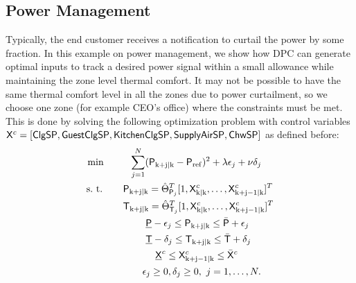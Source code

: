 \subsection{Power Management}
\label{SS:powermanagement}
Typically, the end customer receives a notification to curtail the power by some fraction. 
In this example on power management, we show how DPC can generate optimal inputs to track a desired power signal within a small allowance while maintaining the zone level thermal comfort. It may not be possible to have the same thermal comfort level in all the zones due to power curtailment, so we choose one zone (for example CEO's office) where the constraints must be met.
This is done by solving the following optimization problem with control variables $\mathsf{X}^c = [\mathsf{ClgSP},\mathsf{GuestClgSP},\mathsf{KitchenClgSP},\mathsf{SupplyAirSP}, \mathsf{ChwSP}]$ as defined before:
\begin{align}
\begin{aligned}
\text{min } & \ \ \ \ \ \ \ \sum_{j=1}^{N} ({\mathsf{P}}_{\mathrm{k+j|k}} - \mathsf{P}_{\mathrm{ref}})^2 +  \lambda\epsilon_j + \nu \delta_j \\
\text{s.~t. } & \ \ \ \ \ \mathsf{P}_{\mathrm{k+j|k}} =  \hat{\Theta}^T_{\mathsf{P}_j} [ 1,\mathsf{X}^c_{\mathrm{k|k}},\dots,\mathsf{X}^c_{\mathrm{k+j-1|k}} ]^T \\
& \ \ \ \ \ \mathsf{T}_{\mathrm{k+j|k}} =  \hat{\Theta}^T_{\mathsf{T}_j} [ 1,\mathsf{X}^c_{\mathrm{k|k}},\dots,\mathsf{X}^c_{\mathrm{k+j-1|k}} ]^T \\
& \ \ \ \ \ \ \ \ \ \ \ \ \underline{\mathsf{P}}-\epsilon_j \leq \mathsf{P}_{\mathrm{k+j|k}} \leq \bar{\mathsf{P}} + \epsilon_j\\
& \ \ \ \ \ \ \ \ \ \ \ \ \underline{\mathsf{T}}-\delta_j \leq \mathsf{T}_{\mathrm{k+j|k}} \leq \bar{\mathsf{T}} + \delta_j\\
& \ \ \ \ \ \ \ \ \ \ \ \ \ \ \ \underline{\mathsf{X}}^c \leq \mathsf{X}^c_{\mathrm{k+j-1|k}} \leq \bar{\mathsf{X}}^c\\ 
& \ \ \ \ \ \ \ \ \ \ \ \epsilon_j \geq 0,\delta_j \geq 0, \ j = 1,\dots,N.
\end{aligned}
\label{E:ptrack}
\end{align}

